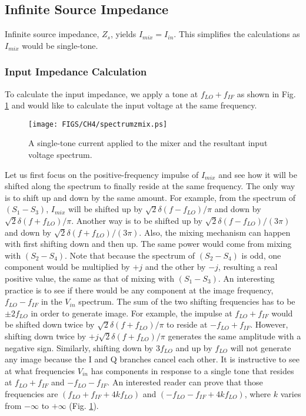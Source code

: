 \subsection{Infinite Source Impedance}
Infinite source impedance, $Z_s$, yields $I_{mix}=I_{in}$. This simplifies the calculations as $I_{mix}$ would be single-tone.
\subsubsection{Input Impedance Calculation} 
To calculate the input impedance, we apply a tone at $f_{LO}+f_{IF}$ as shown in Fig. \ref{fig:spectrumzmix} and would like to calculate the input voltage
at the same frequency. 
\begin{figure}[htb!]
\centering
\texttt{[image: FIGS/CH4/spectrumzmix.ps]}
\caption{A single-tone current applied to the mixer and the resultant input voltage spectrum.}
\label{fig:spectrumzmix}
\end{figure}
Let us first focus on the positive-frequency impulse of
$I_{mix}$ and see how it will be shifted along the spectrum to finally reside at the same frequency. The only way is to shift up and down by the
same amount. For example, from the spectrum of $(S_1-S_3)$, $I_{mix}$ will be shifted up by $\sqrt 2 \delta (f-f_{LO})/\pi$ and down by  $\sqrt 2
\delta (f+f_{LO})/\pi$. Another way is to be shifted up by $\sqrt 2 \delta (f-f_{LO})/(3\pi)$ and down by $\sqrt 2 \delta (f+f_{LO})/(3\pi)$.
Also, the mixing mechanism can happen with first shifting down and then up. The same power would come from mixing with $(S_2-S_4)$. Note that
because the spectrum of $(S_2-S_4)$ is odd, one component would be multiplied by $+j$ and the other by $-j$, resulting a real positive value, the
same as that of mixing with $(S_1-S_3)$.
An interesting practice is to see if there would be any component at the image frequency, $f_{LO}-f_{IF}$ in the $V_{in}$ spectrum. The sum of the
two shifting frequencies has to be $\pm 2 f_{LO}$ in order to generate image. For example, the impulse at $f_{LO}+f_{IF}$ would be shifted down twice by
$\sqrt 2 \delta (f+f_{LO})/\pi$ to reside at $-f_{LO}+f_{IF}$. However, shifting down twice by  $+j \sqrt 2 \delta (f+f_{LO})/\pi$ generates the
same amplitude with a negative sign. Similarly, shifting down by $3 f_{LO}$ and up by $f_{LO}$ will not generate any image because the I and Q
branches cancel each other. It is instructive to see at what frequencies $V_{in}$ has components in response to a single tone that resides at
$f_{LO}+f_{IF}$ and $-f_{LO}-f_{IF}$. An interested reader can prove that those frequencies are $(f_{LO}+f_{IF}+4kf_{LO})$ and
$(-f_{LO}-f_{IF}+4kf_{LO})$, where $k$ varies from $-\infty$ to $+\infty$ (Fig. \ref{fig:spectrumzmix}).


